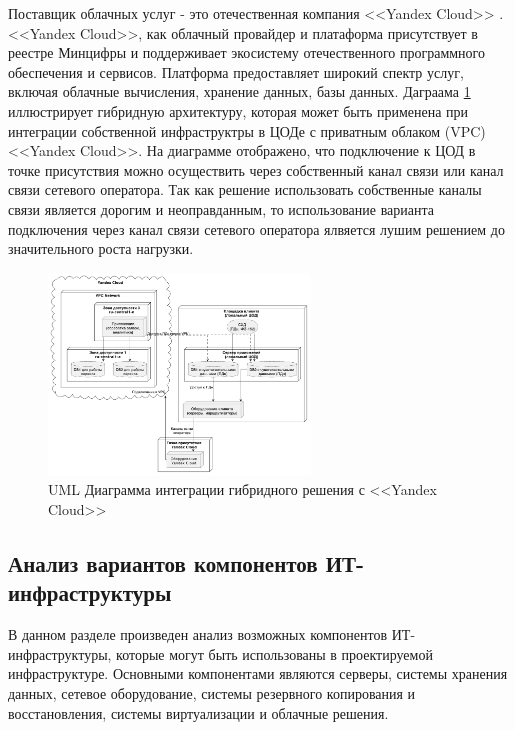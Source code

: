 \documentclass[14pt, a4paper]{extarticle}
\begin{document}
Поставщик облачных услуг - это отечественная компания <<Yandex Cloud>> \cite{yandex-cloud-for-finance}.
<<Yandex Cloud>>, как облачный провайдер и платаформа присутствует в реестре Минцифры
и поддерживает экосистему отечественного программного обеспечения и сервисов. Платформа
предоставляет широкий спектр услуг, включая облачные вычисления, хранение данных, базы данных.
Даграама \ref{fig:ya-clound-hybrid-conneciton-diagram} иллюстрирует гибридную архитектуру,
которая может быть применена при интеграции собственной инфраструктры в ЦОДе с приватным
облаком (VPC) <<Yandex Cloud>>. На диаграмме отображено, что подключение к ЦОД в точке
присутствия можно осуществить через собственный канал связи или канал связи сетевого
оператора. Так как решение использовать собственные каналы связи является дорогим и
неоправданным, то использование варианта подключения через канал связи сетевого оператора
ялвяется лушим решением до значительного роста нагрузки.

\begin{figure}[H]
  \centering
  \includegraphics[width=0.62\textwidth]{ya-clound-hybrid-conneciton-diagram.png}
  \caption{UML Диаграмма интеграции гибридного решения с <<Yandex Cloud>>}
  \label{fig:ya-clound-hybrid-conneciton-diagram}
\end{figure}

\subsection{Анализ вариантов компонентов ИТ-инфраструктуры}

В данном разделе произведен анализ возможных компонентов ИТ-инфраструктуры,
которые могут быть использованы в проектируемой инфраструктуре. Основными
компонентами являются серверы, системы хранения данных, сетевое оборудование,
системы резервного копирования и восстановления, системы виртуализации и облачные решения.
\end{document}
